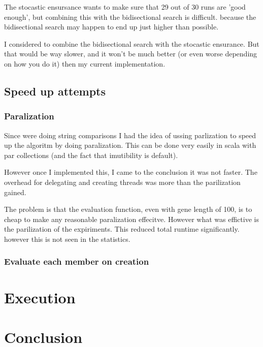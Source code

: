 \documentclass{article}
\begin{document}
The stocastic ensursance wants to make sure that 29 out of 30 runs are
'good enough', but combining this with the bidisectional search is difficult.
because the bidisectional search may happen to end up just higher than possible.

I considered to combine the bidisectional search with the stocastic ensurance.
But that would be way slower, and it won't be much better (or even worse depending
on how you do it) then my current implementation.


\subsection{Speed up attempts}
\subsubsection{Paralization}
Since were doing string comparisons I had the idea of ussing parlization to
speed up the algoritm by doing paralization. This can be done very easily
in scala with par collections (and the fact that imutibility is default).

However once I implemented this, I came to the conclusion it was not faster.
The overhead for delegating and creating threads was more than the parilization
gained.

The problem is that the evaluation function, even with gene length of 100, is
to cheap to make any reasonable paralization effecitve. However what was effictive
is the parilization of the expiriments. This reduced total runtime 
significantly. however this is not seen in the statistics.

\subsubsection{Evaluate each member on creation}
\section{Execution}

\section{Conclusion}
\end{document}
